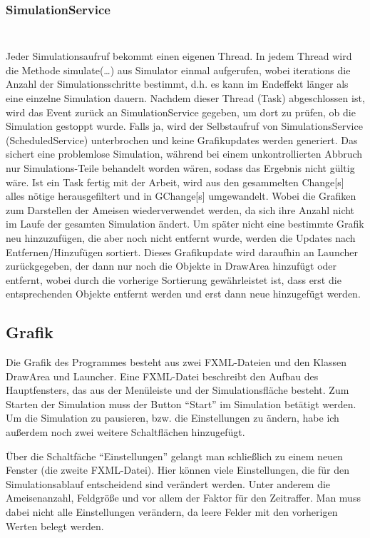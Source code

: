 \documentclass[a4paper,12pt]{scrartcl}
\begin{document}
\subsubsection*{SimulationService}
\begin{lstlisting}

\end{lstlisting}
\begin{lstlisting}

\end{lstlisting}
Jeder Simulationsaufruf bekommt einen eigenen Thread. In jedem Thread wird die Methode simulate(\dots{}) aus Simulator einmal aufgerufen, wobei iterations die Anzahl der Simulationsschritte bestimmt, d.h. es kann im Endeffekt länger als eine einzelne Simulation dauern. Nachdem dieser Thread (Task) abgeschlossen ist, wird das Event zurück an SimulationService gegeben, um dort zu prüfen, ob die Simulation gestoppt wurde. Falls ja, wird der Selbstaufruf von SimulationsService (ScheduledService) unterbrochen und keine Grafikupdates werden generiert. Das sichert eine problemlose Simulation, während bei einem unkontrollierten Abbruch nur Simulations-Teile behandelt worden wären, sodass das Ergebnis nicht gültig wäre.
Ist ein Task fertig mit der Arbeit, wird aus den gesammelten Change[s] alles nötige herausgefiltert und in GChange[s] umgewandelt. Wobei die Grafiken zum Darstellen der Ameisen wiederverwendet werden, da sich ihre Anzahl nicht im Laufe der gesamten Simulation ändert. Um später nicht eine bestimmte Grafik neu hinzuzufügen, die aber noch nicht entfernt wurde, werden die Updates nach Entfernen/Hinzufügen sortiert. Dieses Grafikupdate wird daraufhin an Launcher zurückgegeben, der dann nur noch die Objekte in DrawArea hinzufügt oder entfernt, wobei durch die vorherige Sortierung gewährleistet ist, dass erst die entsprechenden Objekte entfernt werden und erst dann neue hinzugefügt werden.
\subsection*{Grafik}
Die Grafik des Programmes besteht aus zwei FXML-Dateien und den Klassen DrawArea und Launcher.
Eine FXML-Datei beschreibt den Aufbau des Hauptfensters, das aus der Menüleiste und der Simulationsfläche besteht. Zum Starten der Simulation muss der Button "`Start"' im Simulation betätigt werden. Um die Simulation zu pausieren, bzw. die Einstellungen zu ändern, habe ich außerdem noch zwei weitere Schaltflächen hinzugefügt.

Über die Schaltfäche "`Einstellungen"' gelangt man schließlich zu einem neuen Fenster (die zweite FXML-Datei). Hier können viele Einstellungen, die für den Simulationsablauf entscheidend sind verändert werden. Unter anderem die Ameisenanzahl, Feldgröße und vor allem der Faktor für den Zeitraffer. Man muss dabei nicht alle Einstellungen verändern, da leere Felder mit den vorherigen Werten belegt werden.
\end{document}
